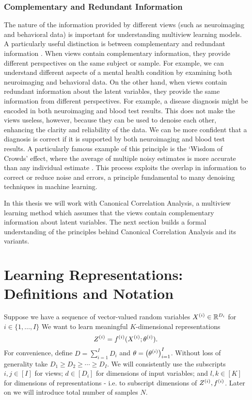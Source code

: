 \subsubsection{Complementary and Redundant Information}
The nature of the information provided by different \gls{views} (such as neuroimaging and behavioral data) is important for understanding multiview learning models.
A particularly useful distinction is between complementary and redundant information \citep{nguyen2020multiview,lyu2021understanding, chen2022representation}.
When views contain complementary information, they provide different perspectives on the same subject or sample.
For example, we can understand different aspects of a mental health condition by examining both neuroimaging and behavioral data.
On the other hand, when \gls{views} contain redundant information about the latent variables, they provide the same information from different perspectives.
For example, a disease diagnosis might be encoded in both neuroimaging and blood test results.
This does not make the \gls{views} useless, however, because they can be used to denoise each other, enhancing the clarity and reliability of the data.
We can be more confident that a diagnosis is correct if it is supported by both neuroimaging and blood test results.
A particularly famous example of this principle is the `Wisdom of Crowds' effect, where the average of multiple noisy estimates is more accurate than any individual estimate \citep{galton1907vox}.
This process exploits the overlap in information to correct or reduce noise and errors, a principle fundamental to many denoising techniques in machine learning.

In this thesis we will work with Canonical Correlation Analysis, a multiview learning method which assumes that the \gls{views} contain complementary information about latent variables.
The next section builds a formal understanding of the principles behind Canonical Correlation Analysis and its variants.

\section{Learning Representations: Definitions and Notation}

Suppose we have a sequence of vector-valued random variables $X^{(i)} \in \mathbb{R}^{D_i}$ for $i \in \{1, \dots, I \}$
We want to learn meaningful $K$-dimensional representations
\begin{equation}
    \label{eq:general-form-of-representations}
    Z^{(i)} = f^{(i)}( X^{(i)}; \theta^{(i)}).
\end{equation}
For convenience, define $D = \sum_{i=1}^I D_i$ and $\theta = \left(\theta^{(i)}\right)_{i=1}^I$.
Without loss of generality take $D_1 \geq D_2 \geq \cdots \geq D_I$.
We will consistently use the subscripts $i,j \in [I]$ for \gls{views};
$d \in [D_i]$ for dimensions of input variables;
and $l,k \in [K]$ for dimensions of representations - i.e. to subscript dimensions of $Z^{(i)}, f^{(i)}$.
Later on we will introduce total number of samples $N$.

